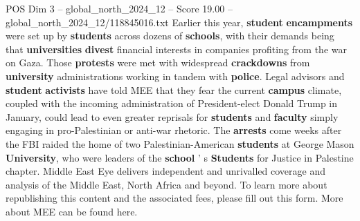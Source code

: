 \begin{textsample}{POS Dim 3 – global\_north\_2024\_12 – Score 19.00 – global\_north\_2024\_12/118845016.txt}
Earlier this year, \textbf{student} \textbf{encampments} were set up by \textbf{students} across dozens of \textbf{schools}, with their demands being that \textbf{universities} \textbf{divest} financial interests in companies profiting from the war on Gaza.
Those \textbf{protests} were met with widespread \textbf{crackdowns} from \textbf{university} administrations working in tandem with \textbf{police}.
Legal advisors and \textbf{student} \textbf{activists} have told MEE that they fear the current \textbf{campus} climate, coupled with the incoming administration of President-elect Donald Trump in January, could lead to even greater reprisals for \textbf{students} and \textbf{faculty} simply engaging in pro-Palestinian or anti-war rhetoric.
The \textbf{arrests} come weeks after the FBI raided the home of two Palestinian-American \textbf{students} at George Mason \textbf{University}, who were leaders of the \textbf{school} ' s \textbf{Students} for Justice in Palestine chapter.
Middle East Eye delivers independent and unrivalled coverage and analysis of the Middle East, North Africa and beyond.
To learn more about republishing this content and the associated fees, please fill out this form.
More about MEE can be found here.

\end{textsample}
